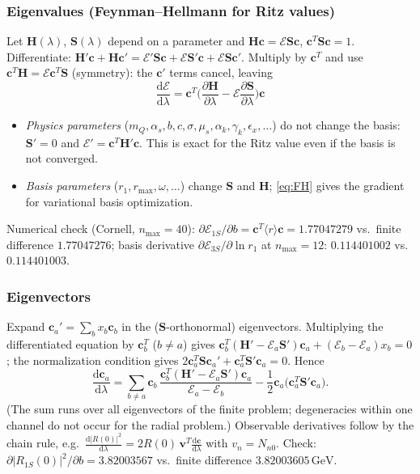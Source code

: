 \documentclass[11pt,a4paper]{article}
\numberwithin{equation}{section}
\theoremstyle{definition}
\theoremstyle{plain}
\theoremstyle{remark}
\numberwithin{algorithm}{section}
\newcommand{\as}{\alpha_s}
\newcommand{\dd}{\mathrm{d}}
\newcommand{\mus}{\mu_s}
\newcommand{\GeV}{\,\mathrm{GeV}}
\newcommand{\mH}{\mathbf H}
\newcommand{\mS}{\mathbf S}
\newcommand{\vc}{\bm c}
\begin{document}
\subsubsection{Eigenvalues (Feynman--Hellmann for Ritz values)}
Let $\mH(\lambda)$, $\mS(\lambda)$ depend on a parameter and $\mH\vc=\mathcal E\mS\vc$, $\vc^T\mS\vc=1$. Differentiate:
$\mH'\vc+\mH\vc'=\mathcal E'\mS\vc+\mathcal E\mS'\vc+\mathcal E\mS\vc'$. Multiply by $\vc^T$ and use $\vc^T\mH=\mathcal E\vc^T\mS$ (symmetry): the $\vc'$ terms cancel, leaving
\begin{equation}
\boxed{\ \frac{\dd\mathcal E}{\dd\lambda}=\vc^T\Big(\frac{\partial\mH}{\partial\lambda}-\mathcal E\frac{\partial\mS}{\partial\lambda}\Big)\vc\ }
\label{eq:FH}
\end{equation}
\begin{itemize}[leftmargin=1.3em,itemsep=2pt]
\item \emph{Physics parameters} ($m_Q,\as,b,c,\sigma,\mus,\alpha_k,\gamma_k,\epsilon_x,\dots$) do not change the basis: $\mS'=0$ and $\mathcal E'=\vc^T\mH'\vc$. This is exact for the Ritz value even if the basis is not converged.
\item \emph{Basis parameters} ($r_1,r_{\max},\omega,\dots$) change $\mS$ and $\mH$; \eqref{eq:FH} gives the gradient for variational basis optimization.
\end{itemize}
Numerical check (Cornell, $n_{\max}=40$): $\partial\mathcal E_{1S}/\partial b=\vc^T\langle r\rangle\vc=1.77047279$ vs.\ finite difference $1.77047276$; basis derivative $\partial\mathcal E_{3S}/\partial\ln r_1$ at $n_{\max}=12$: $0.114401002$ vs.\ $0.114401003$.

\subsubsection{Eigenvectors}
Expand $\vc_a'=\sum_bx_b\vc_b$ in the ($\mS$-orthonormal) eigenvectors. Multiplying the differentiated equation by $\vc_b^T$ ($b\ne a$) gives $\vc_b^T(\mH'-\mathcal E_a\mS')\vc_a+(\mathcal E_b-\mathcal E_a)x_b=0$; the normalization condition gives $2\vc_a^T\mS\vc_a'+\vc_a^T\mS'\vc_a=0$. Hence
\begin{equation}
\frac{\dd\vc_a}{\dd\lambda}=\sum_{b\ne a}\vc_b\,\frac{\vc_b^T(\mH'-\mathcal E_a\mS')\vc_a}{\mathcal E_a-\mathcal E_b}-\frac12\vc_a\big(\vc_a^T\mS'\vc_a\big).
\label{eq:dvec}
\end{equation}
(The sum runs over all eigenvectors of the finite problem; degeneracies within one channel do not occur for the radial problem.) Observable derivatives follow by the chain rule, e.g.\ $\frac{\dd|R(0)|^2}{\dd\lambda}=2R(0)\,\bm v^T\frac{\dd\vc}{\dd\lambda}$ with $v_n=N_{n0}$. Check: $\partial|R_{1S}(0)|^2/\partial b=3.82003567$ vs.\ finite difference $3.82003605\GeV$.
\end{document}
